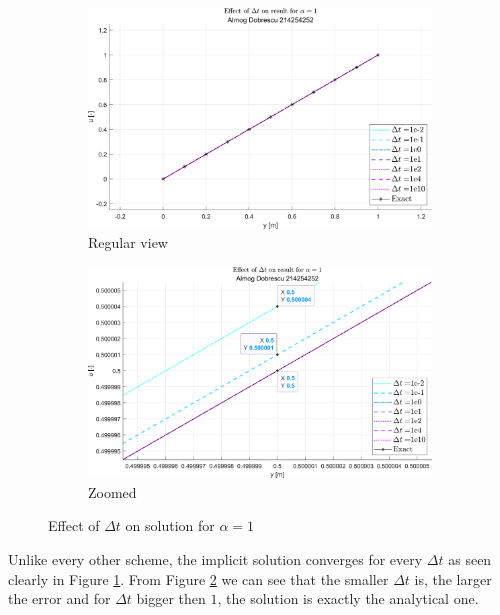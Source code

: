 \documentclass[11pt, a4paper]{article}
\begin{document}
\begin{figure}[H]
    \centering
    \begin{subfigure}[b]{.49\textwidth}
        \centering
        \includegraphics[width=\textwidth]{images/grap8.1.png}
        \caption{Regular view}
        \label{fig7A}
    \end{subfigure}
    \hfill
    \begin{subfigure}[b]{.49\textwidth}
        \centering
        \includegraphics[width=\textwidth]{images/grap8.2.png}
        \caption{Zoomed}
        \label{fig7B}
    \end{subfigure}
    \caption{Effect of $\Delta t$ on solution for $\alpha =1$}
    \label{fig7}
\end{figure}
\noindent Unlike every other scheme, the implicit solution converges for every $\Delta t$ as seen clearly in Figure \ref{fig7A}. From Figure \ref{fig7B} we can see that the smaller $\Delta t$ is, the larger the error and for $\Delta t$ bigger then $1$, the solution is exactly the analytical one. 
\end{document}

